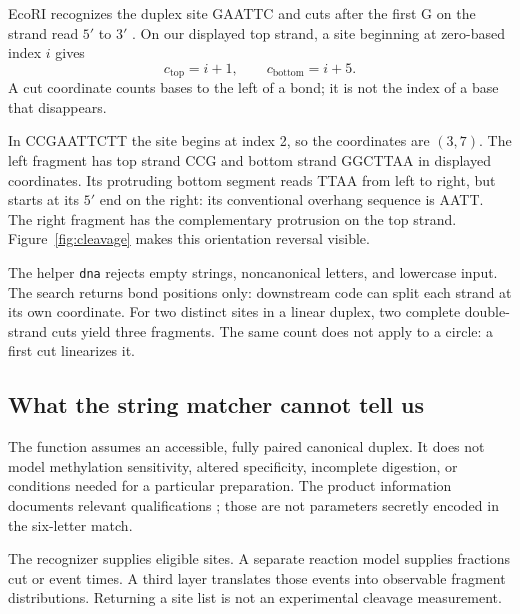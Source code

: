EcoRI recognizes the duplex site GAATTC and cuts after the first G on the strand read $5'$ to $3'$ \cite{NEBEcoRI}. On our displayed top strand, a site beginning at zero-based index $i$ gives
\begin{equation}
c_{\mathrm{top}}=i+1,\qquad c_{\mathrm{bottom}}=i+5.
\label{eq:cuts}
\end{equation}
A cut coordinate counts bases to the left of a bond; it is not the index of a base that disappears.


In CCGAATTCTT the site begins at index 2, so the coordinates are $(3,7)$. The left fragment has top strand CCG and bottom strand GGCTTAA in displayed coordinates. Its protruding bottom segment reads TTAA from left to right, but starts at its $5'$ end on the right: its conventional overhang sequence is AATT. The right fragment has the complementary protrusion on the top strand. Figure~\ref{fig:cleavage} makes this orientation reversal visible.


The helper \texttt{dna} rejects empty strings, noncanonical letters, and lowercase input. The search returns bond positions only: downstream code can split each strand at its own coordinate. For two distinct sites in a linear duplex, two complete double-strand cuts yield three fragments. The same count does not apply to a circle: a first cut linearizes it.

\subsection{What the string matcher cannot tell us}

The function assumes an accessible, fully paired canonical duplex. It does not model methylation sensitivity, altered specificity, incomplete digestion, or conditions needed for a particular preparation. The product information documents relevant qualifications \cite{NEBEcoRI}; those are not parameters secretly encoded in the six-letter match.

The recognizer supplies eligible sites. A separate reaction model supplies fractions cut or event times. A third layer translates those events into observable fragment distributions. Returning a site list is not an experimental cleavage measurement.


